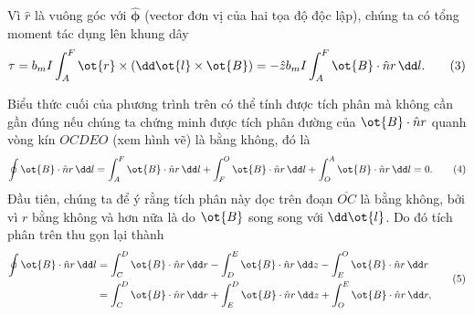 \begin{loigiai}
\begin{center}
\begin{tikzpicture}[x=0.75pt,y=0.75pt,yscale=-1,xscale=1]
\end{tikzpicture}
\end{center}
Vì ${\hat{r}}$ là vuông góc với $\hat{\boldsymbol{\phi}}$ (vector đơn vị của hai tọa độ độc lập), chúng ta có tổng moment tác dụng lên khung dây 
  \[ \tau = b_m I \int_{A}^{F} \ot{r} \times ( \dd \ot{l} \times \ot{B}) = - \hat{{z}} b_m I \int_{A}^{F} \ot{B} \cdot \hat{n} r\,\dd l. \tag{3} \]

Biểu thức cuối của phương trình trên có thể tính được tích phân mà không cần gần đúng nếu chúng ta chứng minh được tích phân đường của $\ot{B} \cdot \hat{n} r $ quanh vòng kín $OCDEO$ (xem hình vẽ) là bằng không, đó là
  \[\oint\ot{B} \cdot \hat{n} r \,\dd l = \int_{A}^{F} \ot{B}\cdot\hat{n} r \,\dd l + \int_{F}^{O} \ot{B}\cdot \hat{n} r  \,\dd l + \int_{O}^{A} \ot{B}\cdot \hat{n} r \, \dd l =0. \tag {4}\]
Đầu tiên, chúng ta để ý rằng tích phân này dọc trên đoạn $\overline{OC}$ là bằng không, bởi vì $r$ bằng không và hơn nữa là do $\ot{B}$ song song với $\dd\ot{l}$. Do đó tích phân trên thu gọn lại thành
  \[ \begin{aligned}
       \oint \ot{B}\cdot \hat{n} r \, \dd l &= \int_{C}^{D} \ot{B} \cdot \hat{n} r \, \dd r - \int_{D}^{E} \ot{B} \cdot \hat{n} r \, \dd z - \int_{E}^{O} \ot{B} \cdot \hat{n} r \, \dd r\\
         &= \int_{C}^{D} \ot{B} \cdot \hat{n} r \, \dd r + \int_{E}^{D} \ot{B} \cdot \hat{n} r \, \dd z + \int_{O}^{E} \ot{B}\cdot \hat{n} r \, \dd r,  \end{aligned} \tag{5}\]


\end{loigiai}
